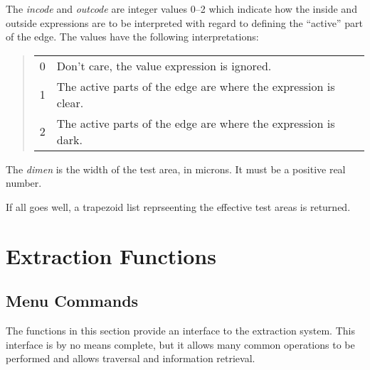 \begin{description}
The {\it incode} and {\it outcode} are integer values 0--2 which
indicate how the inside and outside expressions are to be interpreted
with regard to defining the ``active'' part of the edge.  The values
have the following interpretations:

\begin{quote}
\begin{tabular}{ll}
0 & Don't care, the value expression is ignored.\\
1 & The active parts of the edge are where the expression is clear.\\
2 & The active parts of the edge are where the expression is dark.\\
\end{tabular}
\end{quote}

The {\it dimen} is the width of the test area, in microns.  It must be
a positive real number.

If all goes well, a trapezoid list reprseenting the effective test
areas is returned.

\end{description}


\section{Extraction Functions}
\subsection{Menu Commands}

The functions in this section provide an interface to the extraction
system.  This interface is by no means complete, but it allows many
common operations to be performed and allows traversal and information
retrieval.

